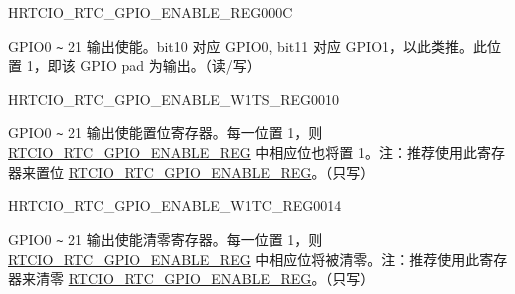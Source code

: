 \begin{register}{H}{RTCIO\_RTC\_GPIO\_ENABLE\_REG}{\hexprefix{}000C}\label{regdesc:RTCIORTCGPIOENABLEREG}
%
%
\regnewline%
\begin{regdesc}\begin{reglist}
\label{fielddesc:RTCIOGPIOENABLE}\item [RTCIO\_GPIO\_ENABLE] GPIO0 \verb+~+ 21 输出使能。bit10 对应 GPIO0, bit11 对应 GPIO1，以此类推。此位置 1，即该 GPIO pad 为输出。（读/写）
\end{reglist}\end{regdesc}
\end{register}


\begin{register}{H}{RTCIO\_RTC\_GPIO\_ENABLE\_W1TS\_REG}{\hexprefix{}0010}\label{regdesc:RTCIORTCGPIOENABLEW1TSREG}
%
%
\regnewline%
\begin{regdesc}\begin{reglist}
\label{fielddesc:RTCIOGPIOENABLEW1TS}\item [RTCIO\_GPIO\_ENABLE\_W1TS] GPIO0 \verb+~+ 21 输出使能置位寄存器。每一位置 1，则 \hyperref[regdesc:RTCIORTCGPIOENABLEREG]{RTCIO\_RTC\_GPIO\_ENABLE\_REG} 中相应位也将置 1。注：推荐使用此寄存器来置位 \hyperref[regdesc:RTCIORTCGPIOENABLEREG]{RTCIO\_RTC\_GPIO\_ENABLE\_REG}。（只写）
\end{reglist}\end{regdesc}
\end{register}


\begin{register}{H}{RTCIO\_RTC\_GPIO\_ENABLE\_W1TC\_REG}{\hexprefix{}0014}\label{regdesc:RTCIORTCGPIOENABLEW1TCREG}
%
%
\regnewline%
\begin{regdesc}\begin{reglist}
\label{fielddesc:RTCIOGPIOENABLEW1TC}\item [RTCIO\_GPIO\_ENABLE\_W1TC] GPIO0 \verb+~+ 21 输出使能清零寄存器。每一位置 1，则 \hyperref[regdesc:RTCIORTCGPIOENABLEREG]{RTCIO\_RTC\_GPIO\_ENABLE\_REG} 中相应位将被清零。注：推荐使用此寄存器来清零 \hyperref[regdesc:RTCIORTCGPIOENABLEREG]{RTCIO\_RTC\_GPIO\_ENABLE\_REG}。（只写）
\end{reglist}\end{regdesc}
\end{register}


